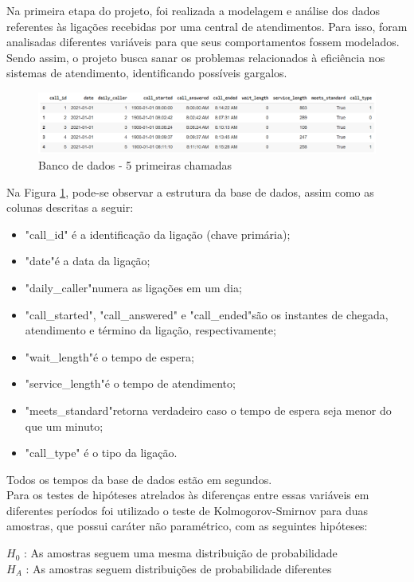 Na primeira etapa do projeto, foi realizada a modelagem e análise dos dados referentes às ligações recebidas por uma central de atendimentos. Para isso, foram analisadas diferentes variáveis para que seus comportamentos fossem modelados. Sendo assim, o projeto busca sanar os problemas relacionados à eficiência nos sistemas de atendimento, identificando possíveis gargalos.

\begin{figure}[H]
    \includegraphics[scale= 0.6]{analise-de-dados/intro-analise/imgintro.png}
    \caption{Banco de dados - 5 primeiras chamadas}
    \label{fig: bd_img}
\end{figure}

Na Figura \ref*{fig: bd_img}, pode-se observar a estrutura da base de dados, assim como as colunas descritas a seguir:

\begin{itemize} 
    \item"call\_id" é a identificação da ligação (chave primária);
    \item"date"\;é a data da ligação;
    \item "daily\_caller"\;numera as ligações em um dia;
    \item"call\_started", "call\_answered" e "call\_ended"\;são os instantes de chegada, atendimento e término  da ligação, respectivamente;
    \item "wait\_length"\;é o tempo de espera;
    \item"service\_length"\;é o tempo de atendimento;
    \item"meets\_standard"\;retorna verdadeiro caso o tempo de espera seja menor do que um minuto;
    \item"call\_type" é o tipo da ligação.
\end{itemize}

Todos os tempos da base de dados estão em segundos.\\
Para os testes de hipóteses atrelados às diferenças entre essas variáveis em diferentes períodos foi utilizado o teste de Kolmogorov-Smirnov para duas amostras, que possui caráter não paramétrico, com as seguintes hipóteses:\\

\begin{center}
$H_0$ : As amostras seguem uma mesma distribuição de probabilidade\\
$H_A$ : As amostras seguem distribuições de probabilidade diferentes
\end{center}

